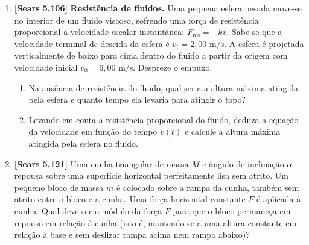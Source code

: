 \documentclass[11pt,a4paper]{article}
\begin{document}
\begin{enumerate}[label=\textbf{\arabic*.}, leftmargin=*, itemsep=0.45cm, resume]
\item \textbf{[Sears 5.106]} \textbf{Resistência de fluidos.} Uma pequena esfera pesada move-se no interior de um fluido viscoso, sofrendo uma força de resistência proporcional à velocidade escalar instantânea: $F_{\text{res}} = -k v$. Sabe-se que a velocidade terminal de descida da esfera é $v_t = 2,00\text{ m/s}$. A esfera é projetada verticalmente de baixo para cima dentro do fluido a partir da origem com velocidade inicial $v_0 = 6,00\text{ m/s}$. Despreze o empuxo.
\begin{enumerate}[label=\alph*)]
    \item Na ausência de resistência do fluido, qual seria a altura máxima atingida pela esfera e quanto tempo ela levaria para atingir o topo?
    \item Levando em conta a resistência proporcional do fluido, deduza a equação da velocidade em função do tempo $v(t)$ e calcule a altura máxima atingida pela esfera no fluido.
\end{enumerate}

\item \textbf{[Sears 5.121]} Uma cunha triangular de massa $M$ e ângulo de inclinação $\alpha$ repousa sobre uma superfície horizontal perfeitamente lisa sem atrito. Um pequeno bloco de massa $m$ é colocado sobre a rampa da cunha, também sem atrito entre o bloco e a cunha. Uma força horizontal constante $F$ é aplicada à cunha. Qual deve ser o módulo da força $F$ para que o bloco permaneça em repouso em relação à cunha (isto é, mantendo-se a uma altura constante em relação à base e sem deslizar rampa acima nem rampa abaixo)?

\end{enumerate}
\end{document}
